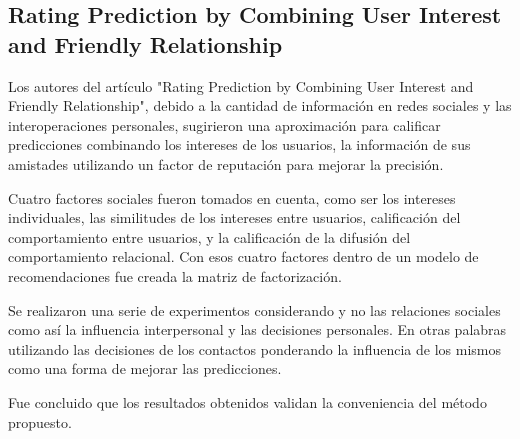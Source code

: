 \subsection{
    Rating Prediction by Combining User Interest
            and Friendly Relationship
}

Los autores del artículo "Rating Prediction by Combining User Interest
and Friendly Relationship"\cite[pág. 167]{somaniEmerging2019}, debido a la cantidad de información en redes sociales y las interoperaciones personales, sugirieron una aproximación para calificar predicciones combinando los intereses de los usuarios, la información de sus amistades
utilizando un factor de reputación para mejorar la precisión.\par

Cuatro factores sociales fueron tomados en cuenta, como ser los intereses individuales,
las similitudes de los intereses entre usuarios, calificación del comportamiento entre usuarios,
y la calificación de la difusión del comportamiento relacional. Con esos cuatro factores dentro
de un modelo de recomendaciones fue creada la matriz de factorización.\par

Se realizaron una serie de experimentos considerando y no las relaciones sociales
como así la influencia interpersonal y las decisiones personales.
En otras palabras utilizando las decisiones de los contactos ponderando
la influencia de los mismos como una forma de mejorar las predicciones.\par

Fue concluido que los resultados obtenidos validan la conveniencia del método propuesto.\par

